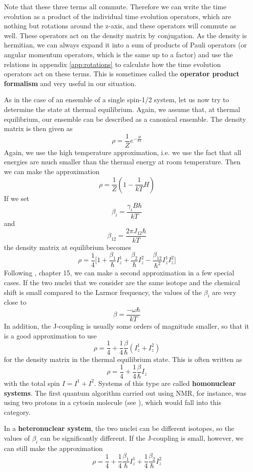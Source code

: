 \documentclass[a4paper, draft]{article}
\theoremstyle{own}
\theoremstyle{remark}
\begin{document}
Note that these three terms all commute. Therefore we can write the time evolution as a product of the individual time evolution operators, which are nothing but rotations around the z-axis, and these operators will commute as well. These operators act on the density matrix by conjugation. As the density is hermitian, we can always expand it into a sum of products of Pauli operators (or angular momentum operators, which is the same up to a factor) and use the relations in appendix \ref{app:rotations} to calculate how the time evolution operators act on these terms. This is sometimes called the {\bf operator product formalism} and very useful in our situation. 

As in the case of an ensemble of a single spin-1/2 system, let us now try to determine the state at thermal equilibrium. Again, we assume that, at thermal equilibrium, our ensemble can be described as a canonical ensemble. The density matrix is then given as
$$
\rho = \frac{1}{Z} e^{-\frac{H}{kT}}
$$
Again, we use the high temperature approximation, i.e. we use the fact that all energies are much smaller than the thermal energy at room temperature. Then we can make the approximation
$$
\rho = \frac{1}{Z} (1 - \frac{1}{kT} H)
$$
If we set
$$
\beta_i = \frac{\gamma_i  B \hbar}{kT}
$$
and
$$
\beta_{12} = \frac{2\pi J_{12} \hbar}{kT}
$$
the density matrix at equilibrium becomes
$$
\rho = \frac{1}{4} \big[  1 + \frac{\beta_1}{\hbar} I^1_z + \frac{\beta_2}{\hbar} I^2_z - \frac{\beta_{12}}{\hbar^2} I_z^1 I_z^2 \big] 
$$
Following \cite{Levitt}, chapter 15, we can make a second approximation in a few special cases. If the two nuclei that we consider are the same isotope and the chemical shift is small compared to the Larmor frequency, the values of the $\beta_i$ are very close to
$$
\beta = \frac{-\omega \hbar}{kT}
$$
In addition, the J-coupling is usually some orders of magnitude smaller, so that it is a good approximation to use
$$
\rho = \frac{1}{4} + \frac{1}{4} \frac{\beta}{\hbar} (I_z^1 + I_z^2)
$$
for the density matrix in the thermal equilibrium state. This is often written as
$$
\rho = \frac{1}{4} + \frac{1}{4} \frac{\beta}{\hbar} I_z
$$
with the total spin $I = I^1 + I^2$. Systems of this type are called {\bf homonuclear systems}. The first quantum algorithm carried out using NMR, for instance, was using two protons in a cytosin molecule (see \cite{JonesMosca}), which would fall into this category. 

In a {\bf heteronuclear system}, the two nuclei can be different isotopes, so the values of $\beta_i$ can be significantly different. If the J-coupling is small, however, we can still make the approximation
$$
\rho = \frac{1}{4} + \frac{1}{4} \frac{\beta_1}{\hbar} I_z^1 + \frac{1}{4} \frac{\beta_2}{\hbar} I_z^2
$$
\end{document}
